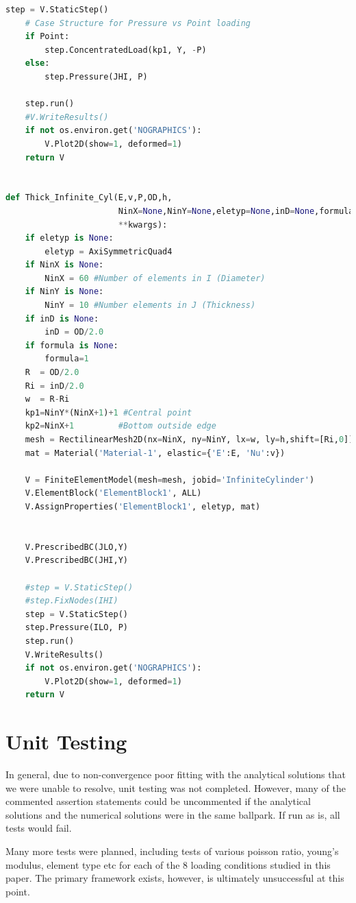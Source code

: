 \documentclass[10pt,letterpaper]{report}
\numberwithin{equation}{chapter}
\begin{document}
\begin{lstlisting}[language=Python]
    step = V.StaticStep()
    # Case Structure for Pressure vs Point loading
    if Point:
        step.ConcentratedLoad(kp1, Y, -P)
    else:
        step.Pressure(JHI, P)
    
    step.run()
    #V.WriteResults()
    if not os.environ.get('NOGRAPHICS'):
        V.Plot2D(show=1, deformed=1)
    return V


def Thick_Infinite_Cyl(E,v,P,OD,h,
                       NinX=None,NinY=None,eletyp=None,inD=None,formula=None,
                       **kwargs):
    if eletyp is None:
        eletyp = AxiSymmetricQuad4
    if NinX is None:
        NinX = 60 #Number of elements in I (Diameter)
    if NinY is None:
        NinY = 10 #Number elements in J (Thickness)
    if inD is None:
        inD = OD/2.0 
    if formula is None:
        formula=1
    R  = OD/2.0
    Ri = inD/2.0
    w  = R-Ri
    kp1=NinY*(NinX+1)+1 #Central point
    kp2=NinX+1         #Bottom outside edge
    mesh = RectilinearMesh2D(nx=NinX, ny=NinY, lx=w, ly=h,shift=[Ri,0])
    mat = Material('Material-1', elastic={'E':E, 'Nu':v})
    
    V = FiniteElementModel(mesh=mesh, jobid='InfiniteCylinder')
    V.ElementBlock('ElementBlock1', ALL)
    V.AssignProperties('ElementBlock1', eletyp, mat)
    
    
    V.PrescribedBC(JLO,Y)
    V.PrescribedBC(JHI,Y)
    
    #step = V.StaticStep()
    #step.FixNodes(IHI)
    step = V.StaticStep()
    step.Pressure(ILO, P)
    step.run()
    V.WriteResults()
    if not os.environ.get('NOGRAPHICS'):
        V.Plot2D(show=1, deformed=1)
    return V
\end{lstlisting}


\chapter{Unit Testing}
In general, due to non-convergence poor fitting with the analytical solutions that we were unable to resolve, unit testing was not completed. However, many of the commented assertion statements could be uncommented if the analytical solutions and the numerical solutions were in the same ballpark. If run as is, all tests would fail. 

Many more tests were planned, including tests of various poisson ratio, young's modulus, element type etc for each of the 8 loading conditions studied in this paper. The primary framework exists, however, is ultimately unsuccessful at this point.
\end{document}
